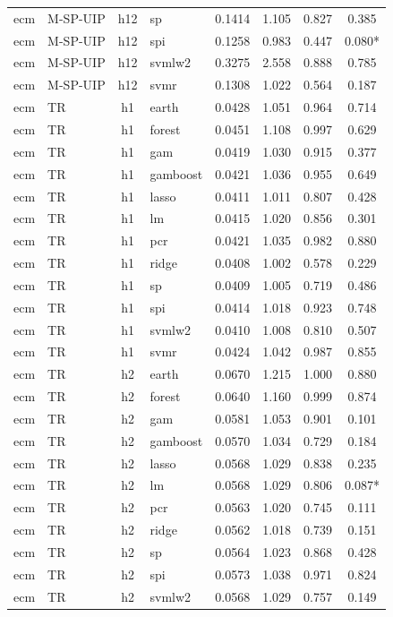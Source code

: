\begin{ThreePartTable}
\begin{longtable}[t]{llclcccc}
ecm & M-SP-UIP & h12 & sp & 0.1414 & 1.105 & 0.827 & 0.385\\
ecm & M-SP-UIP & h12 & spi & 0.1258 & 0.983 & 0.447 & 0.080*\\
ecm & M-SP-UIP & h12 & svmlw2 & 0.3275 & 2.558 & 0.888 & 0.785\\
ecm & M-SP-UIP & h12 & svmr & 0.1308 & 1.022 & 0.564 & 0.187\\
\addlinespace
ecm & TR & h1 & earth & 0.0428 & 1.051 & 0.964 & 0.714\\
ecm & TR & h1 & forest & 0.0451 & 1.108 & 0.997 & 0.629\\
ecm & TR & h1 & gam & 0.0419 & 1.030 & 0.915 & 0.377\\
ecm & TR & h1 & gamboost & 0.0421 & 1.036 & 0.955 & 0.649\\
ecm & TR & h1 & lasso & 0.0411 & 1.011 & 0.807 & 0.428\\
ecm & TR & h1 & lm & 0.0415 & 1.020 & 0.856 & 0.301\\
ecm & TR & h1 & pcr & 0.0421 & 1.035 & 0.982 & 0.880\\
ecm & TR & h1 & ridge & 0.0408 & 1.002 & 0.578 & 0.229\\
ecm & TR & h1 & sp & 0.0409 & 1.005 & 0.719 & 0.486\\
ecm & TR & h1 & spi & 0.0414 & 1.018 & 0.923 & 0.748\\
ecm & TR & h1 & svmlw2 & 0.0410 & 1.008 & 0.810 & 0.507\\
ecm & TR & h1 & svmr & 0.0424 & 1.042 & 0.987 & 0.855\\
\addlinespace
ecm & TR & h2 & earth & 0.0670 & 1.215 & 1.000 & 0.880\\
ecm & TR & h2 & forest & 0.0640 & 1.160 & 0.999 & 0.874\\
ecm & TR & h2 & gam & 0.0581 & 1.053 & 0.901 & 0.101\\
ecm & TR & h2 & gamboost & 0.0570 & 1.034 & 0.729 & 0.184\\
ecm & TR & h2 & lasso & 0.0568 & 1.029 & 0.838 & 0.235\\
ecm & TR & h2 & lm & 0.0568 & 1.029 & 0.806 & 0.087*\\
ecm & TR & h2 & pcr & 0.0563 & 1.020 & 0.745 & 0.111\\
ecm & TR & h2 & ridge & 0.0562 & 1.018 & 0.739 & 0.151\\
ecm & TR & h2 & sp & 0.0564 & 1.023 & 0.868 & 0.428\\
ecm & TR & h2 & spi & 0.0573 & 1.038 & 0.971 & 0.824\\
ecm & TR & h2 & svmlw2 & 0.0568 & 1.029 & 0.757 & 0.149\\

\end{longtable}
\end{ThreePartTable}
